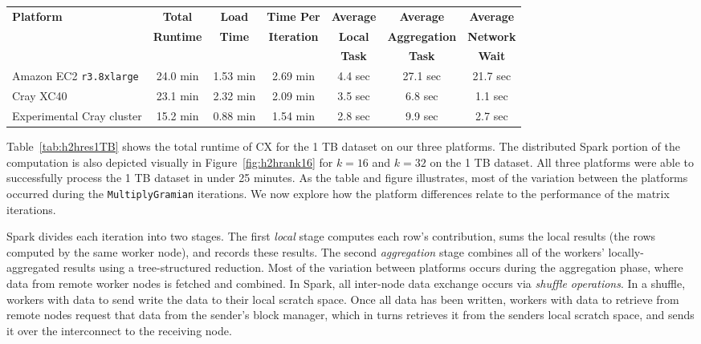     \begin{table*}
    \begin{center}
    \begin{tabular}{| l | c | c | c | c | c | c |}
    \toprule
    \textbf{Platform} & \textbf{Total} & \textbf{Load} & \textbf{Time Per} & \textbf{Average} & \textbf{Average} & \textbf{Average} \\
                               & \textbf{Runtime} & \textbf{Time} & \textbf{Iteration} & \textbf{Local} & \textbf{Aggregation} & \textbf{Network} \\
                               & & & & \textbf{Task} & \textbf{Task} & \textbf{Wait} \\
    \midrule
    Amazon EC2 \texttt{r3.8xlarge} & 24.0 min & 1.53 min & 2.69 min & 4.4 sec & 27.1 sec & 21.7 sec \\
    \midrule
    Cray XC40 & 23.1 min& 2.32 min & 2.09 min &  3.5 sec & 6.8 sec & 1.1 sec \\
    \midrule
    Experimental Cray cluster & 15.2 min & 0.88 min & 1.54 min &  2.8 sec & 9.9 sec & 2.7 sec \\
   \bottomrule
    \end{tabular}
    \end{center}
    \caption{Total runtime for the 1 TB dataset ($k=16$), broken down into load time and per-iteration time. The per-iteration time is further broken down into the average time for each task of the local stage and each task of the aggregation stage.  We also show the average amount of time spent waiting for a network fetch, to illustrate the impact of the interconnect.}
    \label{tab:h2hres1TB}
    \end{table*}
    
Table~\ref{tab:h2hres1TB} shows the total runtime of CX for the 1 TB dataset on
our three platforms.  The distributed Spark portion of the computation is also
depicted visually in Figure~\ref{fig:h2hrank16} for $k=16$ and $k=32$ on the 1
TB dataset.  All three platforms were able to successfully process the 1 TB
dataset in under 25 minutes.  As the table and figure illustrates, most of the
variation between the platforms occurred during the \texttt{MultiplyGramian}
iterations.  We now explore how the platform differences relate to the performance of the matrix
iterations.

Spark divides each iteration into two stages.  The first \emph{local}
stage computes each row's contribution, sums the local results (the
rows computed by the same worker node), and records these %
results.  The second \emph{aggregation} stage combines all of the workers' locally-aggregated results using a tree-structured reduction.  Most of the variation between platforms occurs during the aggregation phase, where data from remote worker nodes is fetched and combined.  In Spark, all inter-node data exchange occurs via \emph{shuffle operations}.  In a shuffle, workers with data to send write the data to their local scratch space.  Once all data has been written, workers with data to retrieve from remote nodes request that data from the sender's block manager, which in turns retrieves it from the senders local scratch space, and sends it over the interconnect to the receiving node.


